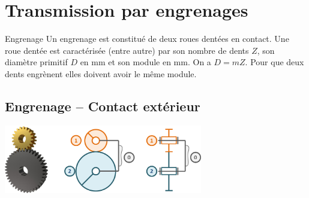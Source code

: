 \def\xxactivite{Cours}
\def\xxauteur{\textsl{Xavier Pessoles}}

\fichetrue
\proftrue
\tdfalse
\coursfalse

\def\xxnumpartie{Rév -- Cin}
\def\xxpartie{Modélisation des actions mécaniques dans les systèmes}
\def\xxnumchapitre{ Révisions 4\vspace{.2cm}}
\def\xxchapitre{\hspace{.12cm} Transmetteurs de puissance}

\def\xxpied{%
Révisions Cinématique -- \xxchapitre \\
Fiche 4 -- \xxactivite%
}


\def\xxcompetences{%
\textsl{%
\textbf{Savoirs et compétences :}\\
}}


\iflivret

\else

\fi
\setlength{\columnseprule}{.1pt}

\vspace{2cm}
\pagestyle{fancy}
\thispagestyle{plain}

\section*{Transmission par engrenages}
\begin{defi}{Engrenage}
Un engrenage est constitué de deux roues dentées en contact. Une roue dentée est caractérisée (entre autre) par son nombre de dents $Z$, son diamètre primitif $D$ en \si{mm} et son module en \si{mm}. On a $D=mZ$.
Pour que deux dents engrènent elles doivent avoir le même module.
\end{defi}

\subsection*{Engrenage -- Contact extérieur}
\begin{center}
\includegraphics[height=3cm]{images/fig_01.png}
\end{center}
